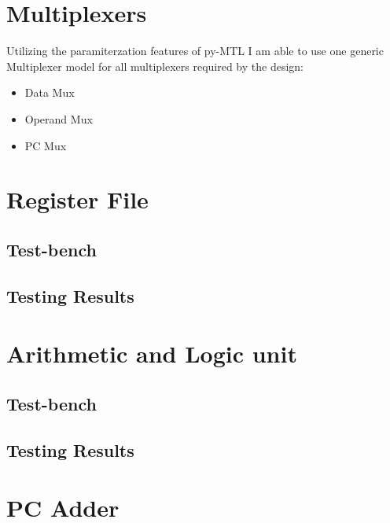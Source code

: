 \documentclass{article}
\begin{document}
\section{Multiplexers}
Utilizing the paramiterzation features of py-MTL I am able to use one generic Multiplexer model for all multiplexers required by the design:
\begin{itemize}
    \item Data Mux
    \item Operand Mux
    \item PC Mux
\end{itemize}


\section{Register File}

\subsection{Test-bench}

\subsection{Testing Results}


\section{Arithmetic and Logic unit}

\subsection{Test-bench}

\subsection{Testing Results}


\section{PC Adder}
\end{document}
